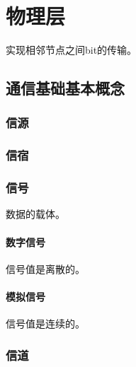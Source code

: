 
\chapter{物理层}

实现相邻节点之间bit的传输。

\section{通信基础基本概念}

\subsection{信源}


\subsection{信宿}


\subsection{信号}
数据的载体。

\subsubsection{数字信号}
信号值是离散的。


\subsubsection{模拟信号}
信号值是连续的。


\subsection{信道}





